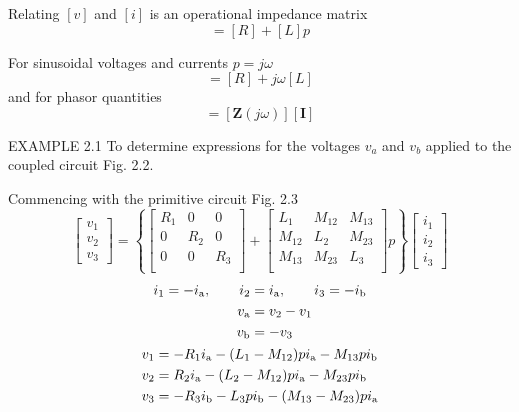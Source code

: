 \documentclass[a4paper,numbers=noenddot,12pt]{scrbook}
\begin{document}
Relating $[v]$ and $[i]$ is an operational impedance matrix
\begin{equation}
    [Z(p)] = [R] + [L]p
    \label{eq:Eq2.19}
\end{equation}

For sinusoidal voltages and currents $p = j \omega$
\begin{equation}
    [\mathbf{Z} (j \omega)] = [R] + j \omega[L]
    \label{eq:Eq2.20}
\end{equation}
and for phasor quantities
\begin{equation}
    [\mathbf{V}] = [\mathbf{Z} (j \omega)] [\mathbf{I}]
    \label{eq:Eq2.21}
\end{equation}

\textsc{EXAMPLE} 2.1 To determine expressions for the voltages $v_a$ and $v_b$ applied to the coupled circuit Fig. 2.2.

Commencing with the primitive circuit Fig. 2.3
\begin{equation*}
    \begin{bmatrix}
        v_1 \\[1ex] v_2 \\[1ex] v_3
    \end{bmatrix}
    =
    \left\{
    \begin{bmatrix}
        R_1 & 0 & 0 \\[1ex]
        0 & R_2 & 0 \\[1ex]
        0 & 0 & R_3 \\
    \end{bmatrix}
    +
    \begin{bmatrix}
        L_1 & M_{12} & M_{13} \\[1ex]
        M_{12} & L_2 & M_{23} \\[1ex]
        M_{13} & M_{23} & L_3 \\
    \end{bmatrix}
    p \right\}
    \begin{bmatrix}
        i_1 \\[1ex] i_2 \\[1ex] i_3
    \end{bmatrix}
\end{equation*}
\begin{gather*}
    \begin{aligned}
        i_1 = -i_{\textup{a}}, \qquad i_2 & = i_{\textup{a}}, \qquad i_3 = -i_{\textup{b}} \\
        v_{\textup{a}} & = v_2 - v_1 \\
        v_{\textup{b}} & = -v_3
    \end{aligned}
    \\
    \begin{aligned}
        v_1 & = -R_1 i_{\textup{a}} - (L_1 - M_{12}) p i_{\textup{a}} - M_{13} p i_{\textup{b}} \\
        v_2 & = R_2 i_{\textup{a}} - (L_2 - M_{12}) p i_{\textup{a}} - M_{23} p i_{\textup{b}} \\
        v_3 & = -R_3 i_{\textup{b}} - L_3 p i_{\textup{b}} - (M_{13} - M_{23}) p i_{\textup{a}} \\
    \end{aligned}
\end{gather*}
\end{document}
